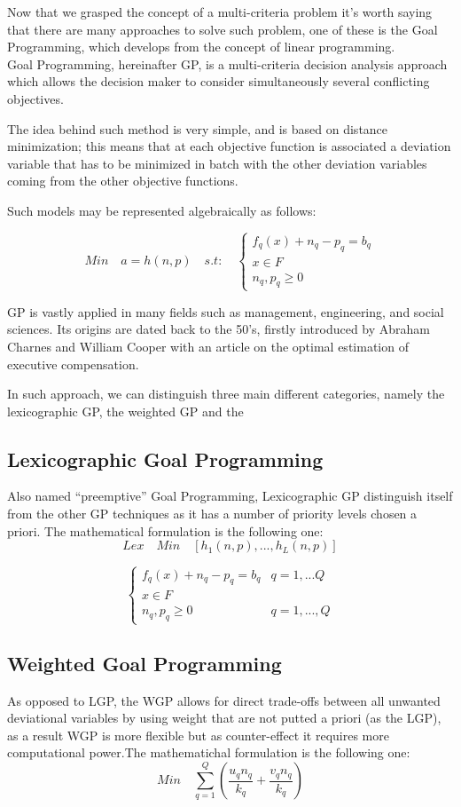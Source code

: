 \documentclass{article}
\begin{document}
Now that we grasped the concept of a multi-criteria problem it's worth saying that there are many approaches to solve such problem, one of these is the Goal Programming, which develops from the concept of linear programming.
\\
Goal Programming, hereinafter GP, is a multi-criteria decision analysis approach which allows the decision maker to consider simultaneously several conflicting objectives.

The idea behind such method is very simple, and is based on distance minimization; this means that at each objective function is associated a deviation variable that has to be minimized in batch with the other deviation variables coming from the other objective functions.

Such models may be represented algebraically as follows:


\[
Min \quad a=h(n,p) \quad s.t: \quad 
\begin{cases}
f_q(x)+n_q-p_q=b_q \\
x\in F \\
n_q,p_q\geq 0
\end{cases}
\]

GP is vastly applied in many fields\cite{tamiz_goal_1998} such as management, engineering, and social sciences. Its origins are dated back to the 50's, firstly introduced by Abraham Charnes and William Cooper\cite{charnes_optimal_1955} with an article on the optimal estimation of executive compensation. 

In such approach, we can distinguish three main different categories, namely the lexicographic GP, the weighted GP and the 

\subsection{Lexicographic Goal Programming}
Also named “preemptive” Goal Programming,  Lexicographic GP distinguish itself from the other GP techniques as it has a number of priority levels chosen a priori. The mathematical formulation is the following one:
\[
Lex \quad Min \quad [h_1(n,p),...,h_L(n,p)]
\]

\[
\begin{cases}
f_q(x)+n_q-p_q=b_q & q=1,...Q
\\
x\in F
\\
n_q,p_q\geq0 & q=1,...,Q
\end{cases}
\]

\subsection{Weighted Goal Programming}
As opposed to LGP, the WGP allows for direct trade-offs between all unwanted deviational variables by using weight that are not putted a priori (as the LGP), as a result WGP is more flexible but as counter-effect it requires more computational power.The mathematichal formulation is the following one:
\[
Min \quad \sum_{q=1}^{Q}(\frac{u_q n_q}{k_q}+\frac{v_q n_q}{k_q})
\]
\end{document}
